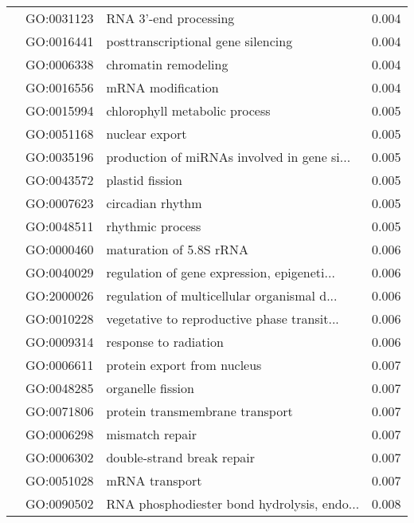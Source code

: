 \begin{longtable}{lllr}
   & GO:0031123 &                        RNA 3'-end processing &         0.004 \\
   & GO:0016441 &           posttranscriptional gene silencing &         0.004 \\
   & GO:0006338 &                         chromatin remodeling &         0.004 \\
   & GO:0016556 &                            mRNA modification &         0.004 \\
   & GO:0015994 &                chlorophyll metabolic process &         0.005 \\
   & GO:0051168 &                               nuclear export &         0.005 \\
   & GO:0035196 &  production of miRNAs involved in gene si... &         0.005 \\
   & GO:0043572 &                              plastid fission &         0.005 \\
   & GO:0007623 &                             circadian rhythm &         0.005 \\
   & GO:0048511 &                             rhythmic process &         0.005 \\
   & GO:0000460 &                      maturation of 5.8S rRNA &         0.006 \\
   & GO:0040029 &  regulation of gene expression, epigeneti... &         0.006 \\
   & GO:2000026 &  regulation of multicellular organismal d... &         0.006 \\
   & GO:0010228 &  vegetative to reproductive phase transit... &         0.006 \\
   & GO:0009314 &                        response to radiation &         0.006 \\
   & GO:0006611 &                  protein export from nucleus &         0.007 \\
   & GO:0048285 &                            organelle fission &         0.007 \\
   & GO:0071806 &              protein transmembrane transport &         0.007 \\
   & GO:0006298 &                              mismatch repair &         0.007 \\
   & GO:0006302 &                   double-strand break repair &         0.007 \\
   & GO:0051028 &                               mRNA transport &         0.007 \\
   & GO:0090502 &  RNA phosphodiester bond hydrolysis, endo... &         0.008 \\

\end{longtable}
